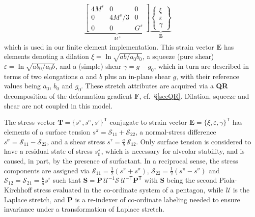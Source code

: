 \begin{subequations}
\begin{align}
    \underbrace{ \begin{bmatrix} 
    4M^s & 0 & 0 \\ 0 & 4M^s/3 & 0 \\ 0 & 0 & G^s 
    \end{bmatrix} }_{\boldsymbol{\mathcal{M}}^s} 
    \underbrace{ \left\{ \begin{matrix} 
    \xi \\ \varepsilon \\ \gamma \end{matrix} 
    \right\} }_{\boldsymbol{E}} 
    \label{pentagonSecantModulus}
    \end{align}
\end{subequations}
which is used in our finite element implementation.  This strain vector $\boldsymbol{E}$ has elements denoting a dilation $\xi = \ln\sqrt{ab/a_0b_0}$, a squeeze (pure shear) $\varepsilon = \ln\sqrt{ab_0/a_0b}$, and a (simple) shear $\gamma = g-g_0$, which in turn are described in terms of two elongations $a$ and $b$ plus an in-plane shear $g$, with their reference values being $a_0$, $b_0$ and $g_0$. These stretch attributes are acquired via a \textbf{QR} decomposition of the deformation gradient $\mathbf{F}$, cf.\ \S\ref{secQR}.    Dilation, squeeze and shear are not coupled in this model.

The stress vector $\boldsymbol{T} = \{ s^{\pi}, s^{\sigma}, s^{\tau} \}^{\mathsf{T}}$ conjugate to strain vector $\boldsymbol{E} = \{ \xi, \varepsilon, \gamma \}^{\mathsf{T}}$ has elements of a surface tension $s^{\pi} = \mathcal{S}_{11} + \mathcal{S}_{22}$, a normal-stress difference $s^{\sigma} = \mathcal{S}_{11} - \mathcal{S}_{22}$, and a shear stress $s^{\tau} = \tfrac{a}{b} \, \mathcal{S}_{12}$.  Only surface tension is considered to have a residual state of stress $s^{\pi}_0$, which is necessary for alveolar stability, and is caused, in part, by the presence of surfactant.  In a reciprocal sense, the stress components are assigned via $\mathcal{S}_{11} = \frac{1}{2} ( s^{\pi} + s^{\sigma} )$, $\mathcal{S}_{22} = \frac{1}{2} ( s^{\pi} - s^{\sigma} )$ and $\mathcal{S}_{12} = \mathcal{S}_{21} = \frac{b}{a} s^{\tau}$ such that $\mathbf{S} = \mathbf{P} \, \boldsymbol{\mathcal{U}}^{-1} \boldsymbol{\mathcal{S}} \, \boldsymbol{\mathcal{U}}^{-\mathsf{T}} \mathbf{P}^{\mathsf{T}}$ with $\mathbf{S}$ being the second Piola-Kirchhoff stress evaluated in the co-ordinate system of a pentagon, while $\boldsymbol{\mathcal{U}}$ is the Laplace stretch, and $\mathbf{P}$ is a re-indexer of co-ordinate labeling needed to ensure invariance under a transformation of Laplace stretch.



